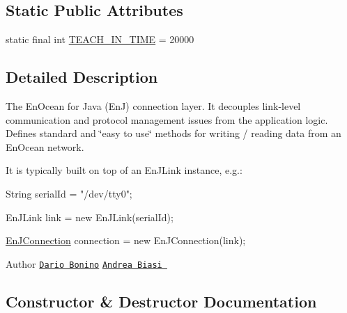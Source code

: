 \subsection*{Static Public Attributes}
\begin{DoxyCompactItemize}
\item 
static final int \hyperlink{classit_1_1polito_1_1elite_1_1enocean_1_1enj_1_1communication_1_1_en_j_connection_a1584089c4459a927b1cd99c8d2249773}{T\+E\+A\+C\+H\+\_\+\+I\+N\+\_\+\+T\+I\+ME} = 20000
\end{DoxyCompactItemize}


\subsection{Detailed Description}
The En\+Ocean for Java (EnJ) connection layer. It decouples link-\/level communication and protocol management issues from the application logic. Defines standard and \char`\"{}easy to use\char`\"{} methods for writing / reading data from an En\+Ocean network. 

It is typically built on top of an En\+J\+Link instance, e.\+g.\+: 


\begin{DoxyPre}
String serialId = "/dev/tty0";\end{DoxyPre}



\begin{DoxyPre}EnJLink link = new EnJLink(serialId);\end{DoxyPre}



\begin{DoxyPre}\hyperlink{classit_1_1polito_1_1elite_1_1enocean_1_1enj_1_1communication_1_1_en_j_connection}{EnJConnection} connection = new EnJConnection(link);
\end{DoxyPre}


\begin{DoxyAuthor}{Author}
\href{mailto:dario.bonino@gmail.com}{\tt Dario Bonino}  \href{mailto:biasiandrea04@gmail.com}{\tt Andrea Biasi } 
\end{DoxyAuthor}


\subsection{Constructor \& Destructor Documentation}
\hypertarget{classit_1_1polito_1_1elite_1_1enocean_1_1enj_1_1communication_1_1_en_j_connection_a1d4409206c2eb68c50d5314df51a535d}{}\label{classit_1_1polito_1_1elite_1_1enocean_1_1enj_1_1communication_1_1_en_j_connection_a1d4409206c2eb68c50d5314df51a535d} 
